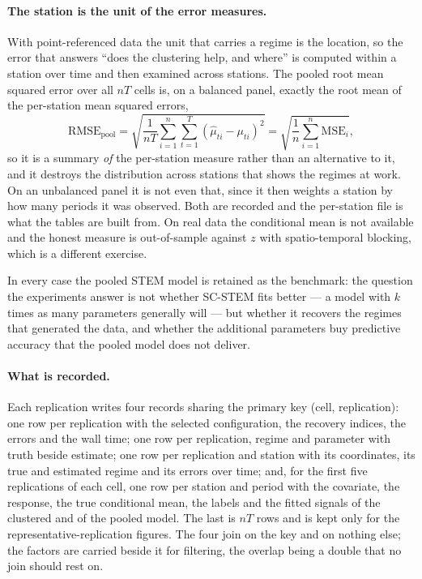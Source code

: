 \paragraph{The station is the unit of the error measures.} With point-referenced data the unit that carries a regime is the location, so the error that answers ``does the clustering help, and where'' is computed within a station over time and then examined across stations. The pooled root mean squared error over all $nT$ cells is, on a balanced panel, exactly the root mean of the per-station mean squared errors,
\begin{equation}
  \mathrm{RMSE}_{\mathrm{pool}}
  = \sqrt{\frac{1}{nT}\sum_{i=1}^{n}\sum_{t=1}^{T} (\hat\mu_{ti} - \mu_{ti})^2}
  = \sqrt{\frac{1}{n}\sum_{i=1}^{n} \mathrm{MSE}_i} ,
  \label{eq:pooledrmse}
\end{equation}
so it is a summary \emph{of} the per-station measure rather than an alternative to it, and it destroys the distribution across stations that shows the regimes at work. On an unbalanced panel it is not even that, since it then weights a station by how many periods it was observed. Both are recorded and the per-station file is what the tables are built from. On real data the conditional mean is not available and the honest measure is out-of-sample against $z$ with spatio-temporal blocking, which is a different exercise.

In every case the pooled STEM model is retained as the benchmark: the question the experiments answer is not whether SC-STEM fits better --- a model with $k$ times as many parameters generally will --- but whether it recovers the regimes that generated the data, and whether the additional parameters buy predictive accuracy that the pooled model does not deliver.

\paragraph{What is recorded.} Each replication writes four records sharing the primary key (cell, replication): one row per replication with the selected configuration, the recovery indices, the errors and the wall time; one row per replication, regime and parameter with truth beside estimate; one row per replication and station with its coordinates, its true and estimated regime and its errors over time; and, for the first five replications of each cell, one row per station and period with the covariate, the response, the true conditional mean, the labels and the fitted signals of the clustered and of the pooled model. The last is $nT$ rows and is kept only for the representative-replication figures. The four join on the key and on nothing else; the factors are carried beside it for filtering, the overlap being a double that no join should rest on.

